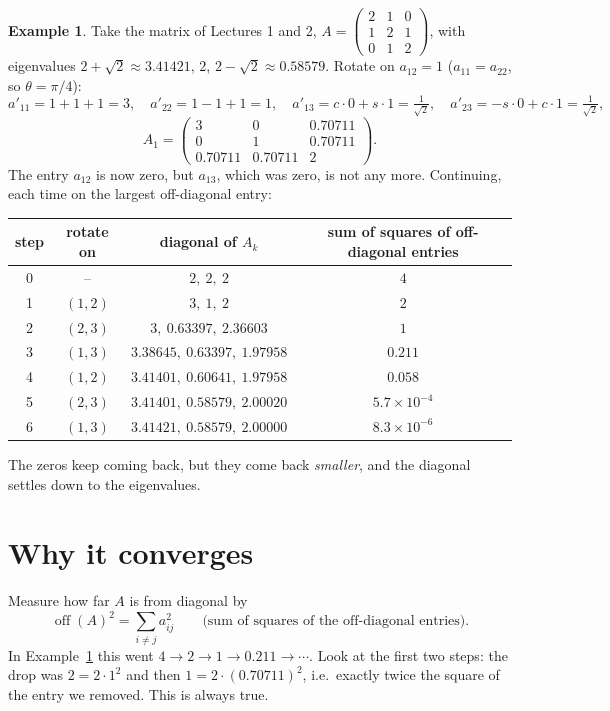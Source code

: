 \documentclass[11pt,a4paper]{article}
\theoremstyle{definition}
\newtheorem{example}{Example}
\theoremstyle{remark}
\newcommand{\off}{\operatorname{off}}
\begin{document}
\begin{example}\label{ex:tri}
Take the matrix of Lectures 1 and 2, $A=\begin{pmatrix}2&1&0\\1&2&1\\0&1&2\end{pmatrix}$, with eigenvalues
$2+\sqrt2\approx3.41421$, $2$, $2-\sqrt2\approx0.58579$. Rotate on $a_{12}=1$ ($a_{11}=a_{22}$, so $\theta=\pi/4$):
\[
a'_{11}=1+1+1=3,\quad a'_{22}=1-1+1=1,\quad a'_{13}=c\cdot0+s\cdot1=\tfrac1{\sqrt2},\quad a'_{23}=-s\cdot0+c\cdot1=\tfrac1{\sqrt2},
\]
\[
A_1=\begin{pmatrix}3&0&0.70711\\0&1&0.70711\\0.70711&0.70711&2\end{pmatrix}.
\]
The entry $a_{12}$ is now zero, but $a_{13}$, which was zero, is not any more. Continuing, each time on the largest
off-diagonal entry:
\begin{center}
\begin{tabular}{@{}cccc@{}}\toprule
step & rotate on & diagonal of $A_k$ & sum of squares of off-diagonal entries\\ \midrule
0 & -- & $2,\ 2,\ 2$ & $4$\\
1 & $(1,2)$ & $3,\ 1,\ 2$ & $2$\\
2 & $(2,3)$ & $3,\ 0.63397,\ 2.36603$ & $1$\\
3 & $(1,3)$ & $3.38645,\ 0.63397,\ 1.97958$ & $0.211$\\
4 & $(1,2)$ & $3.41401,\ 0.60641,\ 1.97958$ & $0.058$\\
5 & $(2,3)$ & $3.41401,\ 0.58579,\ 2.00020$ & $5.7\times10^{-4}$\\
6 & $(1,3)$ & $3.41421,\ 0.58579,\ 2.00000$ & $8.3\times10^{-6}$\\ \bottomrule
\end{tabular}
\end{center}
The zeros keep coming back, but they come back \emph{smaller}, and the diagonal settles down to the eigenvalues.
\end{example}

\section{Why it converges}
Measure how far $A$ is from diagonal by
\[
\off(A)^2=\sum_{i\ne j}a_{ij}^2 \qquad\text{(sum of squares of the off-diagonal entries).}
\]
In Example~\ref{ex:tri} this went $4\to2\to1\to0.211\to\cdots$. Look at the first two steps: the drop was
$2=2\cdot1^2$ and then $1=2\cdot(0.70711)^2$, i.e.\ exactly twice the square of the entry we removed. This is always true.
\end{document}
